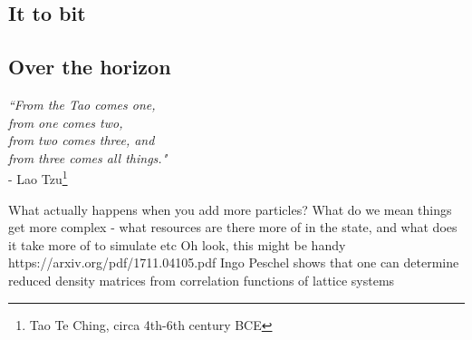 \subsection*{It to bit}%
\subsection*{Over the horizon}%

\begin{adjustwidth}{3cm}{0cm}
\begin{flushright}
\emph{``From the Tao comes one,\\
from one comes two,\\
from two comes three, and\\
from three comes all things."}\\
 - Lao Tzu\footnote{Tao Te Ching, circa 4th-6th century BCE}
\end{flushright}
\end{adjustwidth}
    



	What actually happens when you add more particles? What do we mean things get more complex - what resources are there more of in the state, and what does it take more of to simulate etc
Oh look, this might be handy https://arxiv.org/pdf/1711.04105.pdf
	Ingo Peschel shows that one can determine reduced density matrices from correlation functions of lattice systems \cite{Peschel03} %


